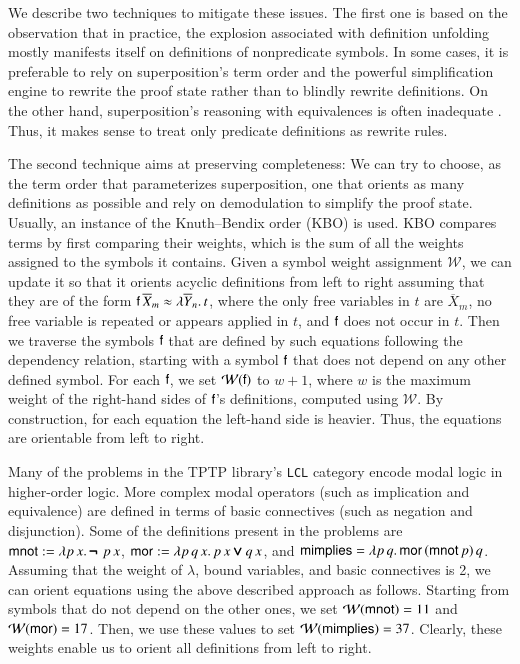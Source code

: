 We describe two techniques to mitigate these issues. The first one is based on the observation that in practice,
the explosion associated with definition unfolding mostly
manifests itself on definitions of nonpredicate symbols. In some cases, it is
preferable to rely on superposition's term order and the powerful simplification
engine to rewrite the proof state rather than to blindly rewrite definitions. On
the other hand, superposition's reasoning with equivalences is often inadequate
\cite{bbtv-21-full-ho-sup, gs-05-boolsup}. Thus, it makes sense to treat only
predicate definitions as rewrite rules.

The second technique aims at preserving completeness: We can try to choose, as the term order that
parameterizes superposition, one that orients as many definitions as possible and rely on
demodulation to simplify the proof state. Usually, an instance of the Knuth--Bendix order (KBO)
\cite{db-1970-kbo} is used. KBO compares terms by first comparing their weights,
which is the sum of all the weights assigned to the symbols it contains. Given a
symbol weight assignment $\mathcal{W}$, we can update it so that it orients
acyclic definitions from left to right assuming that they are of the form $
\mathsf{f} \, \overline{X}_m \approx \lambda \overline{Y}_n. \, t$, where the only free
variables in $t$ are $\overline{X}_m$, no free variable is repeated or appears
applied in $t$, and $\mathsf{f}$ does not occur in $t$. Then we traverse the
symbols $\mathsf{f}$ that are defined by such equations following the dependency
relation, starting with a symbol $\mathsf{f}$ that does not depend on any other
defined symbol. For each $\mathsf{f}$, we set $\mathcal{W}(\mathsf{f})$ to $w + 1$,
where $w$ is the maximum weight of the right-hand sides of $\mathsf{f}$'s
definitions, computed using $\mathcal{W}$. By construction, for each equation
the left-hand side is heavier. Thus, the equations are orientable from left to
right.



\begin{exa} 
  Many of the problems in the TPTP library's \verb|LCL| category encode modal logic
  in higher-order logic. More complex modal operators (such as
  implication and equivalence) are defined in terms of basic connectives (such as negation
  and disjunction). Some of the definitions present in the problems are
  $\mathsf{mnot} := \lambda p\, x. \, \pmb{\neg\,} \, p \, x$, $\mathsf{mor} := \lambda p\, q\, x.
  \, p \, x \pmb{\lor} q \, x$,  and $\mathsf{mimplies} = \lambda p\, q. \allowbreak\, \mathsf{mor} \,
  (\mathsf{mnot} \, p) \, q$. Assuming that the weight of $\lambda$, bound
  variables, and basic connectives is 2, we can orient equations using
  the above described approach as follows. Starting from symbols that do not
  depend on the other ones, we set $\mathcal{W}(\mathsf{mnot}) = 11$ and
  $\mathcal{W}(\mathsf{mor}) = 17$. Then, we use these values to set
  $\mathcal{W}(\mathsf{mimplies}) = 37$. Clearly, these weights
  enable us to orient all definitions from left to right.
\end{exa}


